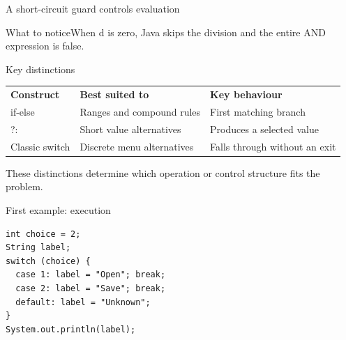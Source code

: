 \documentclass[10pt,aspectratio=169]{beamer}
\begin{document}
\begin{frame}[fragile,t]{A short-circuit guard controls evaluation}
\begin{center}\end{center}
\begin{block}{What to notice}When d is zero, Java skips the division and the entire AND expression is false.\end{block}
\end{frame}
\begin{frame}[fragile,t]{Key distinctions}
\small\renewcommand{\arraystretch}{1.5}
\begin{tabularx}{\textwidth}{>{\raggedright\arraybackslash}X>{\raggedright\arraybackslash}X>{\raggedright\arraybackslash}X}
\rowcolor{navy}
\color{white}\bfseries Construct & \color{white}\bfseries Best suited to & \color{white}\bfseries Key behaviour\\
if-else & Ranges and compound rules & First matching branch\\
?: & Short value alternatives & Produces a selected value\\
Classic switch & Discrete menu alternatives & Falls through without an exit\\
\end{tabularx}
\vspace{3mm}\footnotesize These distinctions determine which operation or control structure fits the problem.
\end{frame}

\begin{frame}[fragile,t]{First example: execution}
\begin{lstlisting}
int choice = 2;
String label;
switch (choice) {
  case 1: label = "Open"; break;
  case 2: label = "Save"; break;
  default: label = "Unknown";
}
System.out.println(label);
\end{lstlisting}
\end{frame}
\end{document}
